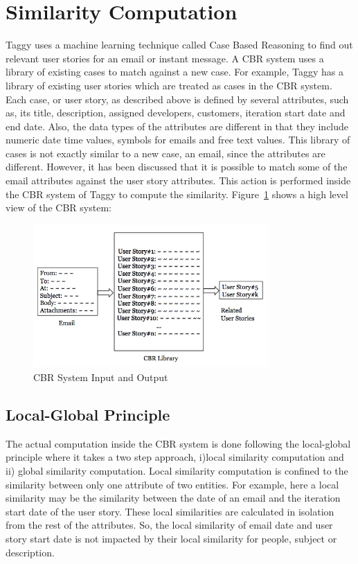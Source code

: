 \section{Similarity Computation}
Taggy uses a machine learning technique called Case Based Reasoning to find out relevant user stories for an email or instant message. A CBR 
system uses a library of existing cases to match against a new case. For example, Taggy has a library of existing user stories which are treated as cases in the CBR system. Each case, or user story, as described above is defined by several attributes, such as, its title, description, assigned developers, customers, iteration start date and end date. Also, the data types of the attributes are different in that they include numeric date time values, symbols for emails and free text values. This library of cases is not exactly similar to a new case, an email, since the attributes are different. However, it has been discussed that it is possible to match some of the email attributes against the user story attributes. This action is performed inside the CBR system of Taggy to compute the similarity. Figure~\ref{fig:CBR} shows a high level view of the CBR system:

\begin{figure}[bt]
	\centering
	\includegraphics[width=0.8\textwidth]{CBR.png}
    \caption{CBR System Input and Output}
	\label{fig:CBR}
\end{figure}

\subsection{Local-Global Principle}

The actual computation inside the CBR system is done following the local-global principle\cite{local_global} where it takes a two step approach, i)local similarity computation and ii) global similarity computation. Local similarity computation is confined to the similarity between only one attribute of two entities. For example, here a local similarity may be the similarity between the date of an email and the iteration start date of the user story. These local similarities are calculated in isolation from the rest of the attributes. So, the local similarity of email date and user story start date is not impacted by their local similarity for people, subject or description.

